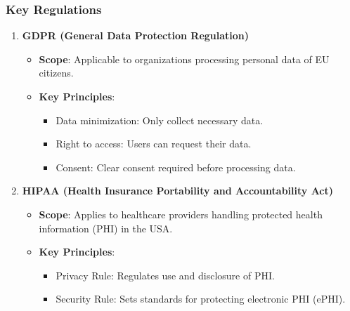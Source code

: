 \documentclass{beamer}
\begin{document}
\begin{frame}[fragile]
    \frametitle{Key Regulations}
    \begin{enumerate}
        \item \textbf{GDPR (General Data Protection Regulation)}
        \begin{itemize}
            \item \textbf{Scope}: Applicable to organizations processing personal data of EU citizens.
            \item \textbf{Key Principles}:
            \begin{itemize}
                \item Data minimization: Only collect necessary data.
                \item Right to access: Users can request their data.
                \item Consent: Clear consent required before processing data.
            \end{itemize}
        \end{itemize}

        \item \textbf{HIPAA (Health Insurance Portability and Accountability Act)}
        \begin{itemize}
            \item \textbf{Scope}: Applies to healthcare providers handling protected health information (PHI) in the USA.
            \item \textbf{Key Principles}:
            \begin{itemize}
                \item Privacy Rule: Regulates use and disclosure of PHI.
                \item Security Rule: Sets standards for protecting electronic PHI (ePHI).
            \end{itemize}
        \end{itemize}
    \end{enumerate}
\end{frame}
\end{document}
